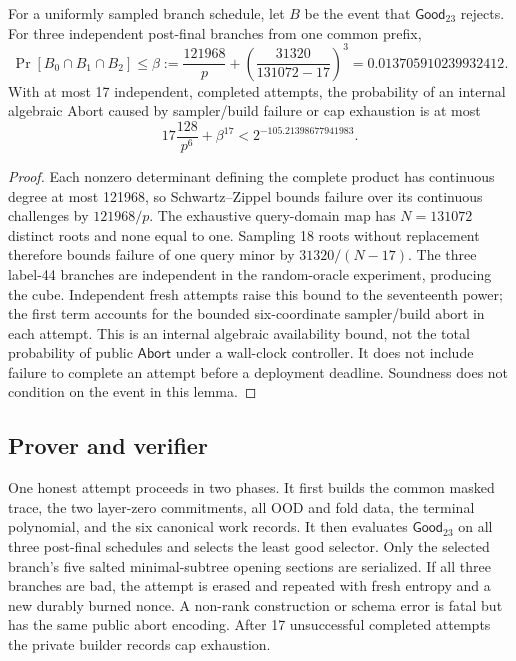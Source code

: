 \begin{lemma}
\label{lem:good23-product}
For a uniformly sampled branch schedule, let \(B\) be the event that
\(\mathsf{Good}_{23}\) rejects.  For three independent post-final branches
from one common prefix,
\[
 \Pr[B_0\cap B_1\cap B_2]\le
 \beta:=\frac{121968}{p}+
 \left(\frac{31320}{131072-17}\right)^3
 =0.013705910239932412.
\]
With at most 17 independent, completed attempts, the probability of an
internal algebraic Abort caused by sampler/build failure or cap exhaustion is
at most
\[
  17\frac{128}{p^6}+\beta^{17}
  <2^{-105.21398677941983}.
\]
\end{lemma}

\begin{proof}
Each nonzero determinant defining the complete product has continuous degree
at most 121968, so Schwartz--Zippel bounds failure over its continuous
challenges by \(121968/p\).  The exhaustive query-domain map has
\(N=131072\) distinct roots and none equal to one.  Sampling 18 roots without
replacement therefore bounds failure of one query minor by
\(31320/(N-17)\).  The three label-44 branches are independent in the
random-oracle experiment, producing the cube.  Independent fresh attempts
raise this bound to the seventeenth power; the first term accounts for the
bounded six-coordinate sampler/build abort in each attempt.  This is an
internal algebraic availability bound, not the total probability of public
\(\mathsf{Abort}\) under a wall-clock controller.  It does not include failure
to complete an attempt before a deployment deadline.  Soundness does not
condition on the event in this lemma.
\end{proof}

\subsection{Prover and verifier}

One honest attempt proceeds in two phases.  It first builds the common masked
trace, the two layer-zero commitments, all OOD and fold data, the terminal
polynomial, and the six canonical work records.  It then evaluates
\(\mathsf{Good}_{23}\) on all three post-final schedules and selects the least
good selector.  Only the selected branch's five salted minimal-subtree
opening sections are serialized.  If all three branches are bad, the attempt
is erased and repeated with fresh entropy and a new durably burned nonce.  A
non-rank construction or schema error is fatal but has the same public abort
encoding.  After 17 unsuccessful completed attempts the private builder
records cap exhaustion.

